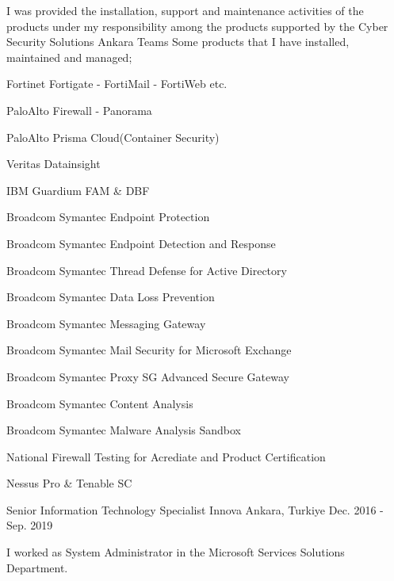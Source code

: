 \begin{cventries}
{      \begin{cvparagraph} %
      I was provided the installation, support and maintenance activities of the products under my responsibility among the products supported by the Cyber Security Solutions Ankara Teams
      Some products that I have installed, maintained and managed;
      \end{cvparagraph}
      \begin{cvitems} %
        \item {Fortinet Fortigate - FortiMail - FortiWeb etc.}
        \item {PaloAlto Firewall - Panorama}
        \item {PaloAlto Prisma Cloud(Container Security)}
        \item {Veritas Datainsight}
        \item {IBM Guardium FAM \& DBF}
        \item {Broadcom Symantec Endpoint Protection}
        \item {Broadcom Symantec Endpoint Detection and Response}
        \item {Broadcom Symantec Thread Defense for Active Directory}   
        \item {Broadcom Symantec Data Loss Prevention}
        \item {Broadcom Symantec Messaging Gateway}
        \item {Broadcom Symantec Mail Security for Microsoft Exchange}
        \item {Broadcom Symantec Proxy SG Advanced Secure Gateway}
        \item {Broadcom Symantec Content Analysis}
        \item {Broadcom Symantec Malware Analysis Sandbox}
        \item {National Firewall Testing for Acrediate and Product Certification}
        \item {Nessus Pro \& Tenable SC} 
      \end{cvitems}
    }
  \cventry
    {Senior Information Technology Specialist} %
    {Innova} %
    {Ankara, Turkiye} %
    {Dec. 2016 - Sep. 2019} %
    {
      \begin{cvitems} %
        \item {I worked as System Administrator in the Microsoft Services Solutions Department.}

\end{cvitems}}
\end{cventries}
